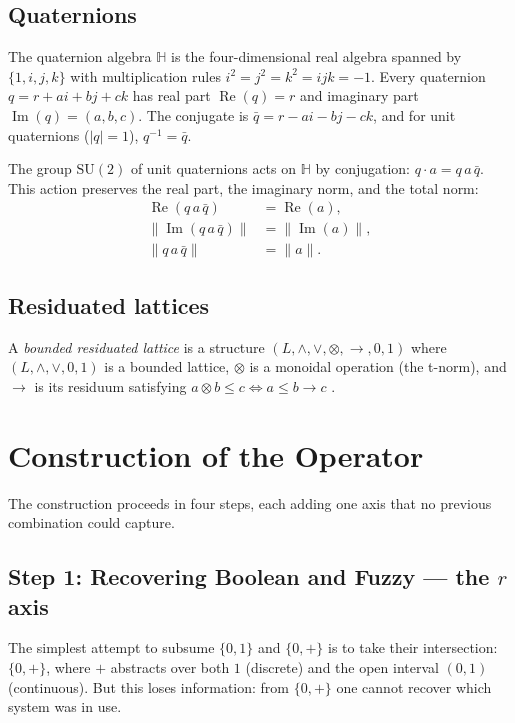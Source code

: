 \documentclass[11pt,a4paper]{article}
\newcommand{\rey}[1]{{\color{rcolor}#1}}
\newcommand{\Real}{\operatorname{Re}}
\newcommand{\Imag}{\operatorname{Im}}
\newcommand{\SU}{\mathrm{SU}(2)}
\def\rey#1{#1}%
\begin{document}
\subsection{Quaternions}

The quaternion algebra $\mathbb{H}$ is the four-dimensional real
algebra spanned by $\{1,i,j,k\}$ with multiplication rules
$i^2=j^2=k^2=ijk=-1$. Every quaternion $q=r+ai+bj+ck$ has real
part $\Real(q)=r$ and imaginary part $\Imag(q)=(a,b,c)$. The
conjugate is $\bar{q}=r-ai-bj-ck$, and for unit quaternions
($|q|=1$), $q^{-1}=\bar{q}$.

The group $\SU$ of unit quaternions acts on $\mathbb{H}$ by
conjugation: $q\cdot a = q\,a\,\bar{q}$. This action preserves
the real part, the imaginary norm, and the total norm:
\begin{align}
  \Real(q\,a\,\bar{q}) &= \Real(a), \label{eq:re-inv}\\
  \|\Imag(q\,a\,\bar{q})\| &= \|\Imag(a)\|, \label{eq:im-norm}\\
  \|q\,a\,\bar{q}\| &= \|a\|. \label{eq:total-norm}
\end{align}

\subsection{Residuated lattices}

A \emph{bounded residuated lattice} is a structure
$(L,\wedge,\vee,\otimes,\to,0,1)$ where $(L,\wedge,\vee,0,1)$ is
a bounded lattice, $\otimes$ is a monoidal operation (the t-norm),
and $\to$ is its residuum satisfying
$a\otimes b\leq c \iff a\leq b\to c$
\citep{galatos2007}.

\section{Construction of the Operator}
\label{sec:construction}

The construction proceeds in four steps, each adding one axis that no
previous combination could capture.

\subsection{Step 1: Recovering Boolean and Fuzzy --- the \texorpdfstring{$\rey{r}$}{r} axis}

The simplest attempt to subsume $\{0,1\}$ and $\{0,+\}$ is to take their
intersection: $\{0, +\}$, where $+$ abstracts over both $1$ (discrete)
and the open interval $(0,1)$ (continuous). But this loses information:
from $\{0,+\}$ one cannot recover which system was in use.
\end{document}
